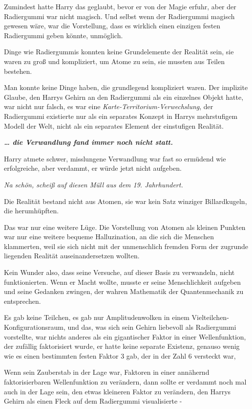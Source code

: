 {Zumindest hatte Harry das geglaubt, bevor er von der Magie erfuhr, aber der Radiergummi war nicht magisch. Und selbst wenn der Radiergummi magisch gewesen wäre, war die Vorstellung, dass es wirklich einen einzigen festen Radiergummi geben könnte, unmöglich.

Dinge wie Radiergummis konnten keine Grundelemente der Realität sein, sie waren zu groß und kompliziert, um Atome zu sein, sie mussten aus Teilen bestehen.

Man konnte keine Dinge haben, die grundlegend kompliziert waren. Der implizite Glaube, den Harrys Gehirn an den Radiergummi als ein einzelnes Objekt hatte, war nicht nur falsch, es war eine \emph{Karte-Territorium-Verwechslung}, der Radiergummi existierte nur als ein separates Konzept in Harrys mehrstufigem Modell der Welt, nicht als ein separates Element der einstufigen Realität.

\textbf{\emph{… die Verwandlung fand immer noch nicht statt.}}

Harry atmete schwer, misslungene Verwandlung war fast so ermüdend wie erfolgreiche, aber verdammt, er würde jetzt nicht aufgeben.

\emph{Na schön, scheiß auf diesen Müll aus dem 19. Jahrhundert.}

Die Realität bestand nicht aus Atomen, sie war kein Satz winziger Billardkugeln, die herumhüpften.

Das war nur eine weitere Lüge. Die Vorstellung von Atomen als kleinen Punkten war nur eine weitere bequeme Halluzination, an die sich die Menschen klammerten, weil sie sich nicht mit der unmenschlich fremden Form der zugrunde liegenden Realität auseinandersetzen wollten.

Kein Wunder also, dass seine Versuche, auf dieser Basis zu verwandeln, nicht funktionierten. Wenn er Macht wollte, musste er seine Menschlichkeit aufgeben und seine Gedanken zwingen, der wahren Mathematik der Quantenmechanik zu entsprechen.

Es gab keine Teilchen, es gab nur Amplitudenwolken in einem Vielteilchen-Konfigurationsraum, und das, was sich sein Gehirn liebevoll als Radiergummi vorstellte, war nichts anderes als ein gigantischer Faktor in einer Wellenfunktion, der zufällig faktorisiert wurde, er hatte keine separate Existenz, genauso wenig wie es einen bestimmten festen Faktor 3 gab, der in der Zahl 6 versteckt war,

Wenn sein Zauberstab in der Lage war, Faktoren in einer annähernd faktorisierbaren Wellenfunktion zu verändern, dann sollte er verdammt noch mal auch in der Lage sein, den etwas kleineren Faktor zu verändern, den Harrys Gehirn als einen Fleck auf dem Radiergummi visualisierte -

}
